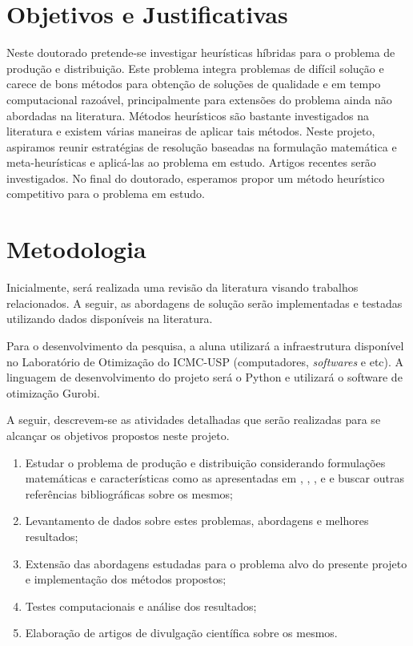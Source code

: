 \documentclass[11pt]{article}
\begin{document}
\section{Objetivos e Justificativas}\label{sec:04}

Neste doutorado pretende-se investigar heurísticas híbridas para o problema de produção e distribuição. Este problema integra problemas de difícil solução e carece de bons métodos para obtenção de soluções de qualidade e em tempo computacional razoável, principalmente para extensões do problema ainda não abordadas na literatura.  Métodos heurísticos são bastante investigados na literatura e existem várias maneiras de aplicar tais métodos. Neste projeto, aspiramos reunir  estratégias de resolução baseadas na formulação matemática e meta-heurísticas e aplicá-las ao problema em estudo. Artigos recentes  serão investigados.  No final do doutorado, esperamos propor um método heurístico competitivo para o problema em estudo. 

\section{Metodologia}\label{sec:05}

Inicialmente, será realizada uma revisão da literatura visando trabalhos relacionados. A seguir, as abordagens de solução serão implementadas e testadas utilizando dados disponíveis na literatura.

Para o desenvolvimento da pesquisa, a aluna utilizará a infraestrutura disponível no Laboratório de Otimização do ICMC-USP (computadores, \textit{softwares} e etc).  A linguagem de desenvolvimento do projeto será o Python e utilizará o software  de otimização Gurobi. 

A seguir, descrevem-se as atividades detalhadas que serão realizadas para se alcançar os objetivos propostos neste projeto. 

\begin{enumerate}
\item Estudar o problema de produção e distribuição considerando formulações matemáticas e características como as apresentadas em , , ,  e   e buscar outras referências bibliográficas sobre os mesmos;
\item	Levantamento de dados sobre estes problemas, abordagens e melhores resultados;
\item Extensão das abordagens estudadas para o problema alvo do presente projeto e implementação dos métodos propostos;
\item	Testes computacionais e análise dos resultados;
\item Elaboração de artigos de divulgação científica sobre os mesmos.
\end{enumerate}
\end{document}
